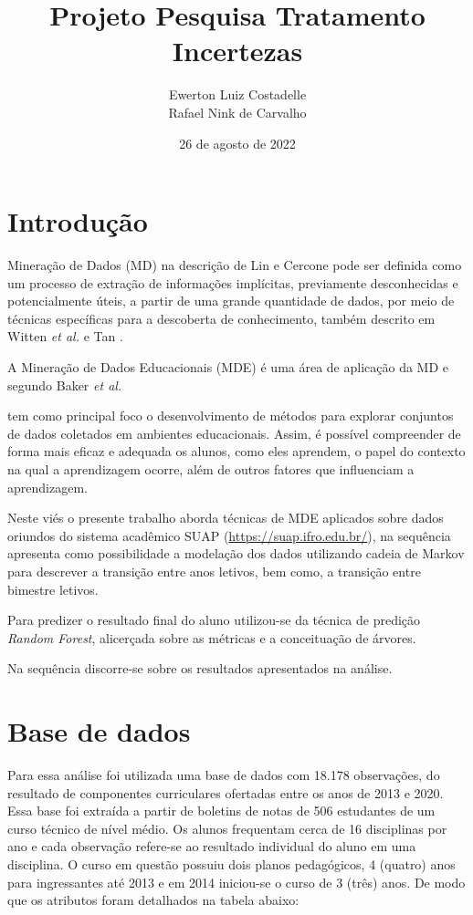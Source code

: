 \documentclass{article}
\title{Projeto Pesquisa Tratamento Incertezas}
\author{Ewerton Luiz Costadelle \\ Rafael Nink de Carvalho}
\date{26 de agosto de 2022}
\begin{document}
\maketitle

\section{Introdução}

Mineração de Dados (MD) na descrição de Lin e Cercone \cite{Lin2012} pode ser definida como um processo de extração de informações implícitas, previamente desconhecidas e potencialmente úteis, a partir de uma grande quantidade de dados, por meio de técnicas específicas para a descoberta de conhecimento, também descrito em Witten \textit{et al.} \cite{Witten2016} e Tan \cite{Tan2019}.

A Mineração de Dados Educacionais (MDE) é uma área de aplicação da MD e segundo Baker \textit{et al.} \cite{Baker2011} 


\begin{quoting}[rightmargin=0cm,leftmargin=2.5cm]
		{\footnotesize 
			\noindent tem como principal foco o desenvolvimento de métodos para explorar conjuntos de dados coletados em ambientes educacionais. Assim, é possível compreender de forma mais eficaz e adequada os alunos, como eles aprendem, o papel do contexto na qual a aprendizagem ocorre, além de outros fatores que influenciam a aprendizagem.
		}
\end{quoting}

Neste viés o presente trabalho aborda técnicas de MDE aplicados sobre dados oriundos do sistema acadêmico SUAP (\url{https://suap.ifro.edu.br/}), na sequência apresenta como possibilidade a modelação dos dados utilizando cadeia de Markov para descrever a transição entre anos letivos, bem como, a transição entre bimestre letivos.

Para predizer o resultado final do aluno utilizou-se da técnica de predição \textit{Random Forest}, alicerçada sobre as métricas e a conceituação de árvores.

Na sequência discorre-se sobre os resultados apresentados na análise.

\section{Base de dados}\label{base_de_dados}

Para essa análise foi utilizada uma base de dados com 18.178 observações, do resultado de componentes curriculares ofertadas entre os anos de 2013 e 2020. Essa base foi extraída a partir de boletins de notas de 506 estudantes de um curso técnico de nível médio. Os alunos frequentam cerca de 16 disciplinas por ano e cada observação refere-se ao resultado individual do aluno em uma disciplina. O curso em questão possuiu dois planos pedagógicos, 4 (quatro) anos para ingressantes até 2013 e em 2014 iniciou-se o curso de 3 (três) anos. De modo que os atributos foram detalhados na tabela abaixo: \\
\end{document}
